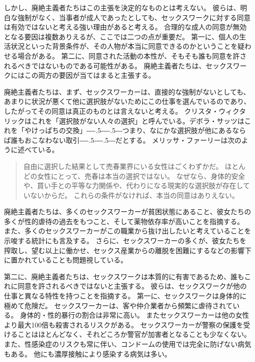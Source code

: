 \documentclass[paper=a4,book,openany]{jlreq}
\def\DDASH{―\kern-.5\zw―\kern-.5\zw―}
\begin{document}
しかし、廃絶主義者たちはこの主張を決定的なものとは考えない。
彼らは、明白な強制がなく、当事者が成人であったとしても、セックスワークに対する同意は有効ではないと考える強い理由があると考える。
合理的な成人の同意が無効となる要因は複数ありえるが、ここでは二つの点が重要だ。
第一に、個人の生活状況といった背景条件が、その人物が本当に同意できるのかということを疑わせる場合がある。
第二に、同意された活動の本性が、そもそも誰も同意を許されるべきではないものである可能性がある。
廃絶主義者たちは、セックスワークにはこの両方の要因が当てはまると主張する。

廃絶主義者たちは、まず、セックスワーカーは、直接的な強制がないとしても、あまりに状況が悪くて他に選択肢がないためにこの仕事を選んでいるのであり、したがってその同意は真正のものとは言えないと考える。
クリスタ・ウィクタリックはこれを「選択肢がない人々の選択」と呼んでいる\citep[p.63]{wichterich00:_global_woman}。デボラ・サッツはこれを「やけっぱちの交換」{\DDASH}つまり、なにかな選択肢が他にあるならば誰もおこなわない取引{\DDASH}だとする\citep[p.71]{satz95:_market_women_sexual_labor}。
メリッサ・ファーリーは次のように述べている。

\begin{quote}
自由に選択した結果として売春業界にいる女性はごくわずかだ。
ほとんどの女性にとって、売春は本当の選択ではない。
なぜなら、身体的安全や、買い手との平等な力関係や、代わりになる現実的な選択肢が存在していないからだ。
これらの条件がなければ、本当の同意はありえない。
\citep{farley13:_prost_liber_slaver}
\end{quote}

廃絶主義者たちは、多くのセックスワーカーが貧困状態にあること、彼女たちの多くが性的虐待の過去をもつこと、そして薬物依存率が高いことを指摘する。
また、多くのセックスワーカーがこの職業から抜け出したいと考えていることを示唆する統計にも言及する。
さらに、セックスワーカーの多くが、彼女たちを搾取し、望む以上に働かせ、セックス産業からの離脱を困難にするなどの影響下に置かれていることも問題視している。

第二に、廃絶主義者たちは、セックスワークは本質的に有害であるため、誰もこれに同意を許されるべきではないと主張する。
彼らは、セックスワークが他の仕事と異なる特性を持つことを指摘する。
第一に、セックスワークは身体的に極めて危険だ。
セックスワーカーは、客や仲介業者から頻繁に虐待されている。
身体的・性的暴行の割合は非常に高い。
またセックスワーカーは他の女性より最大100倍も殺害されるリスクがある\citep{salfati08:_prost_homic}。
セックスワーカーが警察の保護を受けることはほとんどなく、それどころか警官が加害者となることも少なくない。
また、性感染症のリスクも常に伴い、コンドームの使用では完全に防げない病気もある。
他にも濃厚接触により感染する病気は多い。
\end{document}
